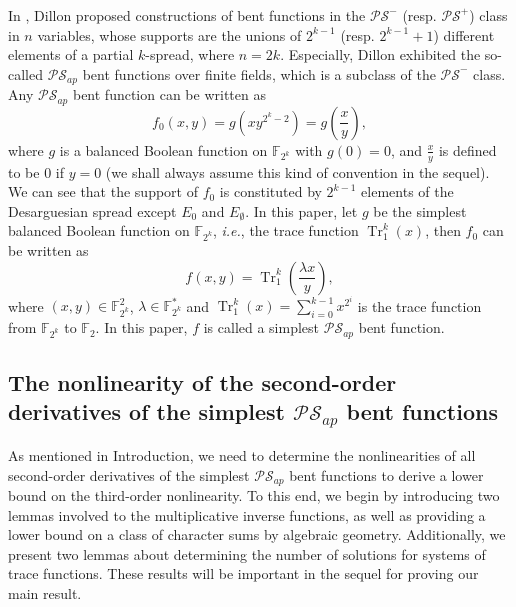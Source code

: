 \documentclass{article}
\newcommand{\F}{\mathbb{F}}
\newcommand{\0}{\textbf{0}}
\newcommand{\1}{\textbf{1}}
\newcommand{\TRACE}{\operatorname{Tr}_1^k}
\theoremstyle{plain}
\begin{document}
In \cite{Dillon1974PSbent}, Dillon proposed constructions of bent functions in the $\mathcal{PS}^-$ (resp. $\mathcal{PS}^+$) class in $n$ variables, whose supports are the unions of $2^{k-1}$ (resp. $2^{k-1}+1$) different elements of a partial $k$-spread, where $n=2k$.
Especially, Dillon exhibited the so-called $\mathcal{PS}_{ap}$ bent functions over finite fields, which is a subclass of the $\mathcal{PS}^-$ class.
Any $\mathcal{PS}_{ap}$ bent function can be written as
\begin{equation*}\label{Eqn_PS_bent}
    f_0(x,y)=g\left(xy^{2^k-2}\right)=g\left(\frac{x}{y}\right),
\end{equation*}
where $g$ is a balanced Boolean function on $\F_{2^{k}}$ with $g(0)=0$, and $\frac{x}{y}$ is defined to be $0$ if $y=0$ (we shall always assume this kind of convention in the sequel).
We can see that the support of $f_0$ is constituted by $2^{k-1}$ elements of the Desarguesian spread except $E_0$ and $E_{\emptyset}$.
In this paper, let $g$ be the simplest balanced Boolean function on $\F_{2^k}$, \emph{i.e.}, the trace function $\TRACE(x)$, then
$f_0$ can be written as
\begin{equation*}\label{sub-bent}
    f(x,y)=\TRACE\left(\frac{\lambda x}{y}\right),
\end{equation*}
where $(x,y)\in\F_{2^k}^2$, $\lambda\in\F_{2^k}^{*}$ and $\TRACE(x)=\sum\limits_{i=0}^{k-1}x^{2^i}$ is the trace function from $\F_{2^k}$ to $\F_2$.
In this paper, $f$ is called a simplest $\mathcal{PS}_{ap}$ bent function.

    \subsection{The nonlinearity of the second-order derivatives of the simplest $\mathcal{PS}_{ap}$ bent functions}
    As mentioned in Introduction,
    we need to determine the nonlinearities of all second-order derivatives of the simplest $\mathcal{PS}_{ap}$ bent functions to derive a lower bound on the third-order nonlinearity.
    To this end, we begin by introducing two lemmas involved to the multiplicative inverse functions,
    as well as providing a lower bound on a class of character sums by algebraic geometry.
    Additionally, we present two lemmas about determining the number of solutions for systems of trace functions.
    These results will be important in the sequel for proving our main result.
\end{document}
